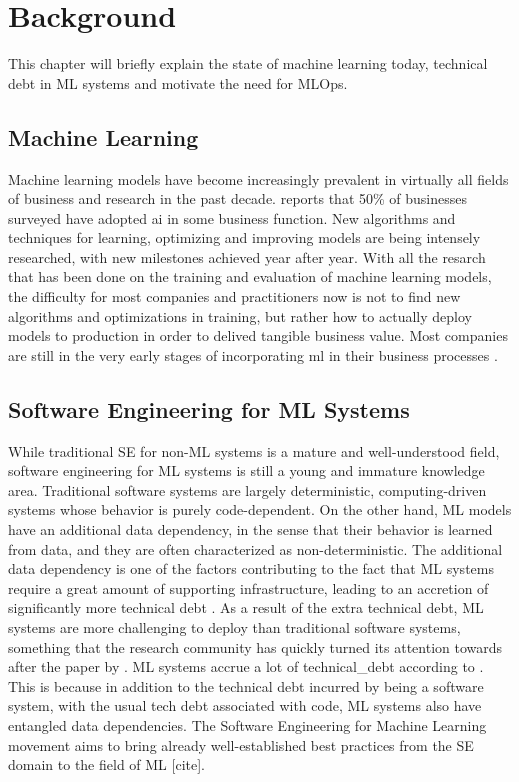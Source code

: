 \chapter{Background}
\label{ch:background}
This chapter will briefly explain the state of machine learning today, technical debt in ML systems and motivate the need for MLOps.

\section{Machine Learning}
Machine learning models have become increasingly prevalent in virtually all fields of business and research in the past decade.
\textcite{mckinsey2020} reports that 50\% of businesses surveyed have adopted \acrshort{ai} in some business function.
New algorithms and techniques for learning, optimizing and improving models are being intensely researched, with new milestones achieved year after year.
With all the resarch that has been done on the training and evaluation of machine learning models, the difficulty for most companies and practitioners now is not to find new algorithms and optimizations in training, but rather how to actually deploy models to production in order to delived tangible business value.
Most companies are still in the very early stages of incorporating \acrshort{ml} in their business processes \cite{Schloegl2019}.

\section{Software Engineering for ML Systems}
While traditional SE for non-ML systems is a mature and well-understood field, software engineering for ML systems is still a young and immature knowledge area.
Traditional software systems are largely deterministic, computing-driven systems whose behavior is purely code-dependent.
On the other hand, ML models have an additional data dependency, in the sense that their behavior is learned from data, and they are often characterized as non-deterministic.
The additional data dependency is one of the factors contributing to the fact that ML systems require a great amount of supporting infrastructure, leading to an accretion of significantly more technical debt \cite{Sculley2015}.
As a result of the extra technical debt, ML systems are more challenging to deploy than traditional software systems, something that the research community has quickly turned its attention towards after the paper by \cite{Sculley2015}.
ML systems accrue a lot of \gls{technical_debt} according to \textcite{Sculley2015}.
This is because in addition to the technical debt incurred by being a software system, with the usual tech debt associated with code, ML systems also have entangled data dependencies.
The Software Engineering for Machine Learning movement aims to bring already well-established best practices from the SE domain to the field of ML [cite].

